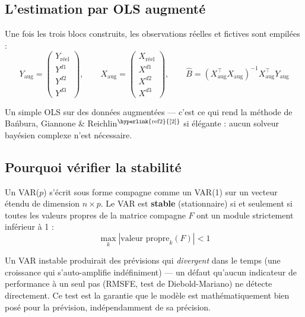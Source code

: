 \documentclass[11pt,a4paper]{article}
\newcommand{\cit}[1]{\textsuperscript{\hyperlink{ref#1}{[#1]}}}
\begin{document}
\subsection{L'estimation par OLS augmenté}

Une fois les trois blocs construits, les observations réelles et fictives sont empilées :
\begin{equation}
Y_{\text{aug}} = \begin{pmatrix} Y_{\text{réel}} \\ Y^{d1} \\ Y^{d2} \\ Y^{d3}\end{pmatrix}, \qquad
X_{\text{aug}} = \begin{pmatrix} X_{\text{réel}} \\ X^{d1} \\ X^{d2} \\ X^{d3}\end{pmatrix}, \qquad
\hat B = (X_{\text{aug}}^\top X_{\text{aug}})^{-1} X_{\text{aug}}^\top Y_{\text{aug}}
\end{equation}

Un simple OLS sur des données augmentées --- c'est ce qui rend la méthode de Bańbura, Giannone \& Reichlin$\cit{2}$ si élégante : aucun solveur bayésien complexe n'est nécessaire.

\subsection{Pourquoi vérifier la stabilité}

\begin{definitionbox}
Un VAR($p$) s'écrit sous forme compagne comme un VAR(1) sur un vecteur étendu de dimension $n\times p$. Le VAR est \textbf{stable} (stationnaire) si et seulement si toutes les valeurs propres de la matrice compagne $F$ ont un module strictement inférieur à 1 :
\[
\max_k |\text{valeur propre}_k(F)| < 1
\]
\end{definitionbox}

\begin{intuition}
Un VAR instable produirait des prévisions qui \emph{divergent} dans le temps (une croissance qui s'auto-amplifie indéfiniment) --- un défaut qu'aucun indicateur de performance à un seul pas (RMSFE, test de Diebold-Mariano) ne détecte directement. Ce test est la garantie que le modèle est mathématiquement bien posé pour la prévision, indépendamment de sa précision.
\end{intuition}
\end{document}
